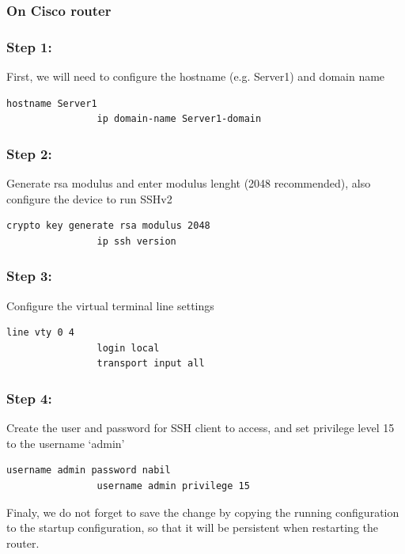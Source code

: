 \subsubsection{On Cisco router}

\subsubsection{Step 1:}
First, we will need to configure the hostname (e.g. Server1) and domain name 
\begin{lstlisting}[style=cliStyle,  backgroundcolor=\color{codebackground}]
                hostname Server1
                ip domain-name Server1-domain
\end{lstlisting}

\subsubsection{Step 2:}
Generate rsa modulus and enter modulus lenght (2048 recommended), also configure the device to run SSHv2
\begin{lstlisting}[style=xmlStyle,  backgroundcolor=\color{codebackground}]
                crypto key generate rsa modulus 2048 
                ip ssh version 
\end{lstlisting}

\subsubsection{Step 3:}
Configure the virtual terminal line settings
\begin{lstlisting}[style=xmlStyle,  backgroundcolor=\color{codebackground}]
                line vty 0 4 
                login local
                transport input all
\end{lstlisting}

\subsubsection{Step 4:}
Create the user and password for SSH client to access, and set privilege level 15 to the username ‘admin’
\begin{lstlisting}[style=xmlStyle,  backgroundcolor=\color{codebackground}]
                username admin password nabil 
                username admin privilege 15 
\end{lstlisting}

\indent Finaly, we do not forget to save the change by copying the running configuration to the startup configuration, so that it will be persistent when restarting the router.

